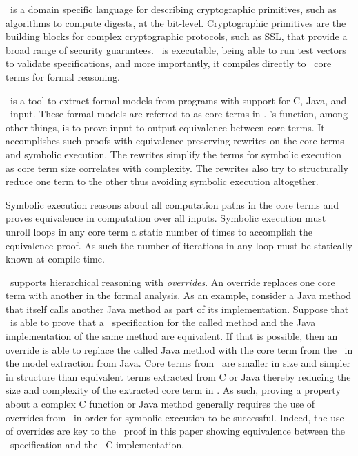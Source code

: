 \cryptol\ is a domain specific language for describing cryptographic primitives, such as algorithms to compute digests, at the bit-level.
Cryptographic primitives are the building blocks for complex cryptographic protocols, such as SSL, that provide a broad range of security guarantees.
\cryptol\ is executable, being able to run test vectors to validate specifications, and more importantly, it compiles directly to \saw\ core terms for formal reasoning.

\saw\ is a tool to extract formal models from programs with support for C, Java, and \cryptol\ input.
These formal models are referred to as core terms in \saw.
\saw's function, among other things, is to prove input to output equivalence between core terms.
It accomplishes such proofs with equivalence preserving rewrites on the core terms and symbolic execution.
The rewrites simplify the terms for symbolic execution as core term size correlates with complexity. 
The rewrites also try to structurally reduce one term to the other thus avoiding symbolic execution altogether.

Symbolic execution reasons about all computation paths in the core terms and proves equivalence in computation over all inputs.
Symbolic execution must unroll loops in any core term a static number of times to accomplish the equivalence proof.
As such the number of iterations in any loop must be statically known at compile time.

\saw\ supports hierarchical reasoning with \emph{overrides}.
An override replaces one core term with another in the formal analysis.
As an example, consider a Java method that itself calls another Java method as part of its implementation.
Suppose that \saw\ is able to prove that a \cryptol\ specification for the called method and the Java implementation of the same method are equivalent.
If that is possible, then an override is able to replace the called Java method with the core term from the \cryptol\ in the model extraction from Java.
Core terms from \cryptol\ are smaller in size and simpler in structure than equivalent terms extracted from C or Java thereby reducing the size and complexity of the extracted core term in \saw.
As such, proving a property about a complex C function or Java method generally requires the use of overrides from \cryptol\ in order for symbolic execution to be successful.
Indeed, the use of overrides are key to the \saw\ proof in this paper showing equivalence between the \shaThree\ specification and the \openssl\ C implementation.

